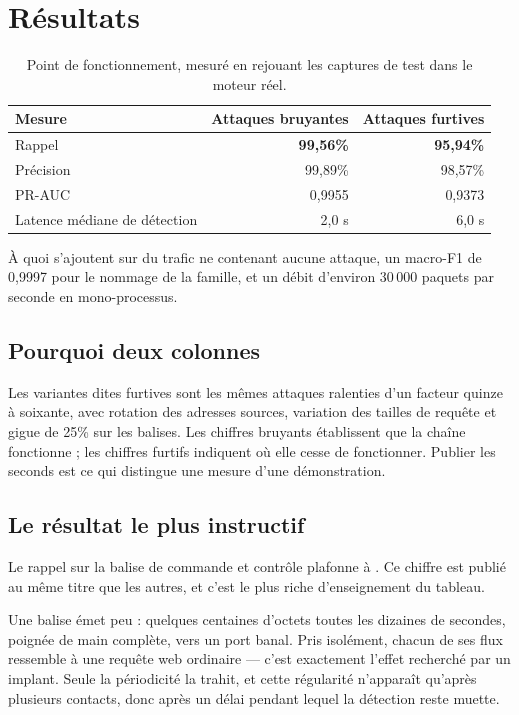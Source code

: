 \documentclass[11pt,a4paper]{article}
\begin{document}
\section{Résultats}

\begin{table}[h]\centering\small
\begin{tabularx}{\linewidth}{@{}X r r@{}}
\toprule
\textbf{Mesure} & \textbf{Attaques bruyantes} & \textbf{Attaques furtives} \\
\midrule
Rappel & \textbf{99,56\%} & \textbf{95,94\%} \\
Précision & 99,89\% & 98,57\% \\
PR-AUC & 0,9955 & 0,9373 \\
Latence médiane de détection & 2,0 s & 6,0 s \\
\bottomrule
\end{tabularx}
\caption{Point de fonctionnement, mesuré en rejouant les captures de test dans le moteur réel.}
\end{table}

À quoi s'ajoutent  sur du trafic ne contenant aucune
attaque, un macro-F1 de 0,9997 pour le nommage de la famille, et un débit d'environ 30\,000 paquets
par seconde en mono-processus.

\subsection*{Pourquoi deux colonnes}

Les variantes dites furtives sont les mêmes attaques ralenties d'un facteur quinze à soixante, avec
rotation des adresses sources, variation des tailles de requête et gigue de 25\% sur les balises.
Les chiffres bruyants établissent que la chaîne fonctionne ; les chiffres furtifs indiquent où elle
cesse de fonctionner. Publier les seconds est ce qui distingue une mesure d'une démonstration.

\subsection*{Le résultat le plus instructif}

Le rappel sur la balise de commande et contrôle plafonne à . Ce chiffre est publié au
même titre que les autres, et c'est le plus riche d'enseignement du tableau.

Une balise émet peu : quelques centaines d'octets toutes les dizaines de secondes, poignée de main
complète, vers un port banal. Pris isolément, chacun de ses flux ressemble à une requête web
ordinaire --- c'est exactement l'effet recherché par un implant. Seule la périodicité la trahit, et
cette régularité n'apparaît qu'après plusieurs contacts, donc après un délai pendant lequel la
détection reste muette.
\end{document}
